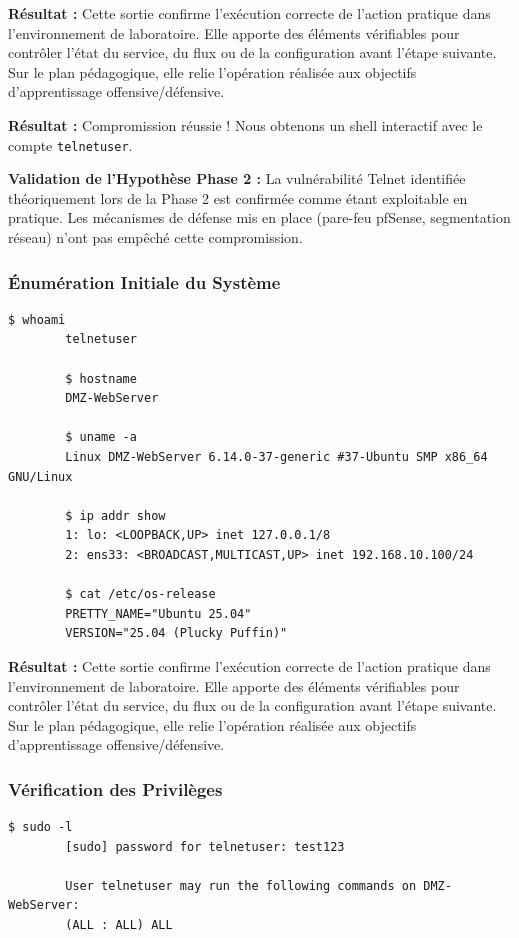 \documentclass[12pt,a4paper,openany]{report}
\begin{document}
	\textbf{Résultat :} Cette sortie confirme l'exécution correcte de l'action pratique dans l'environnement de laboratoire. Elle apporte des éléments vérifiables pour contrôler l'état du service, du flux ou de la configuration avant l'étape suivante. Sur le plan pédagogique, elle relie l'opération réalisée aux objectifs d'apprentissage offensive/défensive.
	
	
	\textcolor{green}{\checkmark} \textbf{Résultat :} Compromission réussie ! Nous obtenons un shell interactif avec le compte \texttt{telnetuser}.
	
	\textbf{Validation de l'Hypothèse Phase 2 :} La vulnérabilité Telnet identifiée théoriquement lors de la Phase 2 est confirmée comme étant exploitable en pratique. Les mécanismes de défense mis en place (pare-feu pfSense, segmentation réseau) n'ont pas empêché cette compromission.
	
	\subsubsection{Énumération Initiale du Système}
	
	\begin{lstlisting}[caption=Collecte d'Informations Basiques]
		$ whoami
		telnetuser
		
		$ hostname
		DMZ-WebServer
		
		$ uname -a
		Linux DMZ-WebServer 6.14.0-37-generic #37-Ubuntu SMP x86_64 GNU/Linux
		
		$ ip addr show
		1: lo: <LOOPBACK,UP> inet 127.0.0.1/8
		2: ens33: <BROADCAST,MULTICAST,UP> inet 192.168.10.100/24
		
		$ cat /etc/os-release
		PRETTY_NAME="Ubuntu 25.04"
		VERSION="25.04 (Plucky Puffin)"
	\end{lstlisting}
	
	\textbf{Résultat :} Cette sortie confirme l'exécution correcte de l'action pratique dans l'environnement de laboratoire. Elle apporte des éléments vérifiables pour contrôler l'état du service, du flux ou de la configuration avant l'étape suivante. Sur le plan pédagogique, elle relie l'opération réalisée aux objectifs d'apprentissage offensive/défensive.
	
	
	\subsubsection{Vérification des Privilèges}
	
	\begin{lstlisting}[caption=Test des Permissions Sudo]
		$ sudo -l
		[sudo] password for telnetuser: test123
		
		User telnetuser may run the following commands on DMZ-WebServer:
		(ALL : ALL) ALL
	\end{lstlisting}
	
\end{document}
